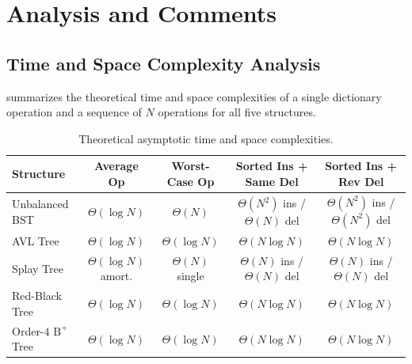 \documentclass[10pt, a4paper]{article}
\begin{document}
\clearpage

\section{Analysis and Comments}

\subsection{Time and Space Complexity Analysis}
 summarizes the theoretical time and space complexities of a single dictionary operation and a sequence of $N$ operations for all five structures.

\begin{table}[H]
\centering
\caption{Theoretical asymptotic time and space complexities.}
\label{tab:complexities}
\setlength{\tabcolsep}{3.5pt}
\begin{tabular}{@{}lcccc@{}}
\toprule
\textbf{\color{primary}Structure} & \textbf{\color{primary}Average Op} & \textbf{\color{primary}Worst-Case Op} & \textbf{\color{primary}Sorted Ins + Same Del} & \textbf{\color{primary}Sorted Ins + Rev Del} \\
\midrule
Unbalanced BST   & $\Theta(\log N)$ & $\Theta(N)$               & $\Theta(N^2)$ ins / $\Theta(N)$ del & $\Theta(N^2)$ ins / $\Theta(N^2)$ del \\
AVL Tree         & $\Theta(\log N)$ & $\Theta(\log N)$          & $\Theta(N\log N)$                   & $\Theta(N\log N)$                     \\
Splay Tree       & $\Theta(\log N)$ amort. & $\Theta(N)$ single & $\Theta(N)$ ins / $\Theta(N)$ del   & $\Theta(N)$ ins / $\Theta(N)$ del     \\
Red-Black Tree   & $\Theta(\log N)$ & $\Theta(\log N)$          & $\Theta(N\log N)$                   & $\Theta(N\log N)$                     \\
Order-$4$ $\text{B}^+$ Tree & $\Theta(\log N)$ & $\Theta(\log N)$ & $\Theta(N\log N)$                   & $\Theta(N\log N)$                     \\
\bottomrule
\end{tabular}
\end{table}
\end{document}
